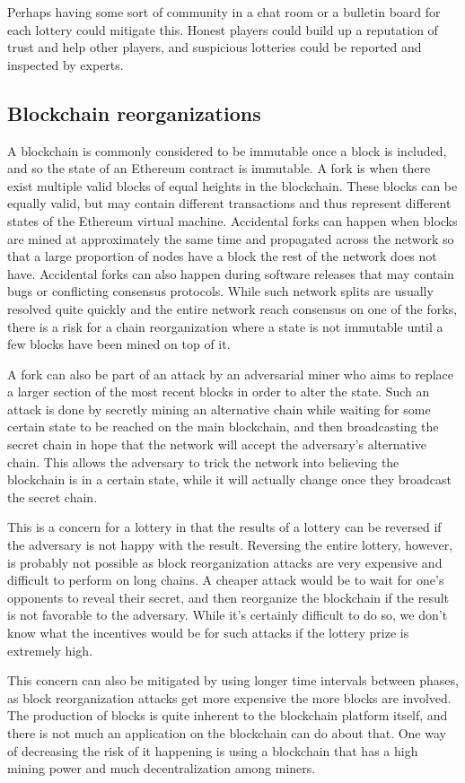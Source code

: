 Perhaps having some sort of community in a chat room or a bulletin board for each lottery could mitigate this. Honest players could build up a reputation of trust and help other players, and suspicious lotteries could be reported and inspected by experts.

\subsection{Blockchain reorganizations}
A blockchain is commonly considered to be immutable once a block is included, and so the state of an Ethereum contract is immutable. A fork is when there exist multiple valid blocks of equal heights in the blockchain. These blocks can be equally valid, but may contain different transactions and thus represent different states of the Ethereum virtual machine. Accidental forks can happen when blocks are mined at approximately the same time and propagated across the network so that a large proportion of nodes have a block the rest of the network does not have. Accidental forks can also happen during software releases that may contain bugs or conflicting consensus protocols. While such network splits are usually resolved quite quickly and the entire network reach consensus on one of the forks, there is a risk for a chain reorganization where a state is not immutable until a few blocks have been mined on top of it.

A fork can also be part of an attack by an adversarial miner who aims to replace a larger section of the most recent blocks in order to alter the state. Such an attack is done by secretly mining an alternative chain while waiting for some certain state to be reached on the main blockchain, and then broadcasting the secret chain in hope that the network will accept the adversary's alternative chain. This allows the adversary to trick the network into believing the blockchain is in a certain state, while it will actually change once they broadcast the secret chain.

This is a concern for a lottery in that the results of a lottery can be reversed if the adversary is not happy with the result. Reversing the entire lottery, however, is probably not possible as block reorganization attacks are very expensive and difficult to perform on long chains. A cheaper attack would be to wait for one's opponents to reveal their secret, and then reorganize the blockchain if the result is not favorable to the adversary. While it's certainly difficult to do so, we don't know what the incentives would be for such attacks if the lottery prize is extremely high.

This concern can also be mitigated by using longer time intervals between phases, as block reorganization attacks get more expensive the more blocks are involved. The production of blocks is quite inherent to the blockchain platform itself, and there is not much an application on the blockchain can do about that. One way of decreasing the risk of it happening is using a blockchain that has a high mining power and much decentralization among miners.
